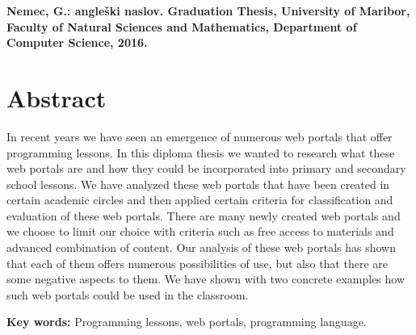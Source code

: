 \textbf{Nemec, G.: angleški naslov. Graduation Thesis, University of
  Maribor, Faculty of Natural Sciences and Mathematics, Department of
  Computer Science, 2016.}

\section*{Abstract}
\label{sec:abstract}

In recent years we have seen an emergence of numerous web portals that offer
programming lessons. In this diploma thesis we wanted to research what these web
portals are and how they could be incorporated into primary and secondary school
lessons. We have analyzed these web portals that have been created in certain
academic circles and then applied certain criteria for classification and
evaluation of these web portals. There are many newly created web portals and we
choose to limit our choice with criteria such as free access to materials and
advanced combination of content. Our analysis of these web portals has shown
that each of them offers numerous possibilities of use, but also that there are
some negative aspects to them. We have shown with two concrete examples how such
web portals could be used in the classroom.

\textbf{Key words:} Programming lessons, web portals, programming language.

